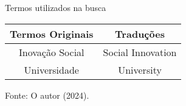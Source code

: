 \begin{quadro}[H]
\centering
\caption{Termos utilizados na busca}
\begin{tabular}{|c|c|}
\hline
\rowcolor[HTML]{C0C0C0} 
\textbf{Termos Originais} & \textbf{Traduções} \\ \hline
Inovação Social           & Social Innovation  \\ \hline
Universidade              & University         \\ \hline
\end{tabular}
\newline
\newline
Fonte: O autor (2024).
\end{quadro}


